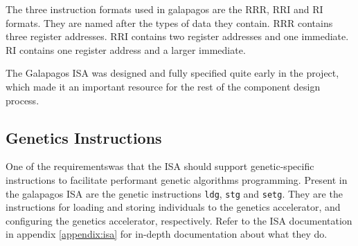 The three instruction formats used in \Gls{galapagos} are the RRR, RRI and RI formats.
They are named after the types of data they contain.
RRR contains three register addresses.
RRI contains two register addresses and one immediate.
RI contains one register address and a larger immediate.

The Galapagos ISA was designed and fully specified quite early in the project, which made it an important resource for the rest of the component design process.

\subsection{Genetics Instructions}

One of the requirements\cn was that the ISA should support genetic-specific instructions to facilitate performant genetic algorithms programming.
Present in the \Gls{galapagos} ISA are the genetic instructions \texttt{ldg}, \texttt{stg} and \texttt{setg}.
They are the instructions for loading and storing \glspl{individual} to the genetics accelerator, and configuring the genetics accelerator, respectively.
Refer to the ISA documentation in appendix \vref{appendix:isa} for in-depth documentation about what they do.

